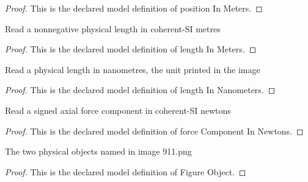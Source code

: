 \begin{proof}
  This is the declared model definition of position In Meters.
\end{proof}
\begin{definition}
  \label{def:physics:phyx-mini-0911:phyxminiproblems-problemphyxmini0911-lengthinmeters}
  Read a nonnegative physical length in coherent-SI metres
\end{definition}
\begin{proof}
  This is the declared model definition of length In Meters.
\end{proof}
\begin{definition}
  \label{def:physics:phyx-mini-0911:phyxminiproblems-problemphyxmini0911-lengthinnanometers}
  Read a physical length in nanometres, the unit printed in the image
\end{definition}
\begin{proof}
  This is the declared model definition of length In Nanometers.
\end{proof}
\begin{definition}
  \label{def:physics:phyx-mini-0911:phyxminiproblems-problemphyxmini0911-forcecomponentinnewtons}
  Read a signed axial force component in coherent-SI newtons
\end{definition}
\begin{proof}
  This is the declared model definition of force Component In Newtons.
\end{proof}
\begin{definition}
  \label{def:physics:phyx-mini-0911:phyxminiproblems-problemphyxmini0911-figureobject}
  The two physical objects named in image 911.png
\end{definition}
\begin{proof}
  This is the declared model definition of Figure Object.
\end{proof}
